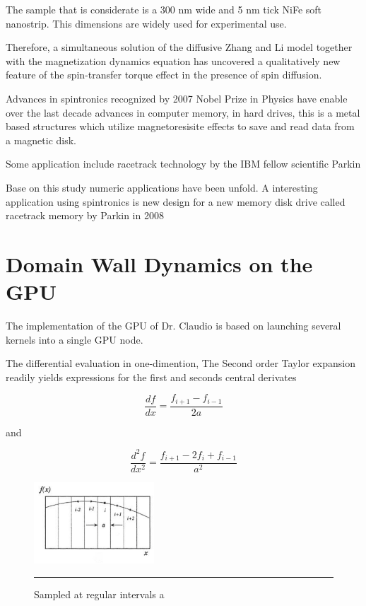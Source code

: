 The sample that is considerate is a 300 nm wide and 5 nm tick NiFe soft nanostrip. This dimensions are widely used for experimental use.

Therefore, a simultaneous solution of the diffusive Zhang and Li model together with the magnetization dynamics equation has uncovered a qualitatively new feature of the spin-transfer torque effect in the presence of spin diffusion.


Advances in spintronics recognized by 2007 Nobel Prize in Physics have enable over the last decade advances in computer memory, in hard drives, this is a metal based structures which utilize magnetoresisite effects to save and read data from a magnetic disk. \cite{handbookspin} 

Some application include racetrack technology by the IBM fellow scientific Parkin \cite{racetrack}

Base on this study numeric applications have been unfold. A interesting application using spintronics is new design for a new memory disk drive called racetrack memory by  Parkin in 2008\cite{racetrack}


\section{Domain Wall Dynamics on the GPU}


The implementation of the GPU of Dr. Claudio is based on launching several kernels into a single GPU node.


The differential evaluation in one-dimention,
The Second order Taylor expansion readily yields expressions for the first and seconds central derivates

$$ \dfrac{df}{dx} = \dfrac{f_{i+1} - f_{i-1} }{2a}$$

and

$$ \dfrac{d^{2}f}{dx^{2}} = \dfrac{f_{i+1} - 2f_{i}+f_{i-1} }{a^2}$$

\begin{figure}[htbp]
	\centering
		\includegraphics[width=0.4\textwidth]{Figures/taylor.png}
		\rule{35em}{0.2pt}
	\caption[Sampled at regular intervals a, Taylor expansion]{Sampled at regular intervals a}
	\label{fig:taylor}
\end{figure}

